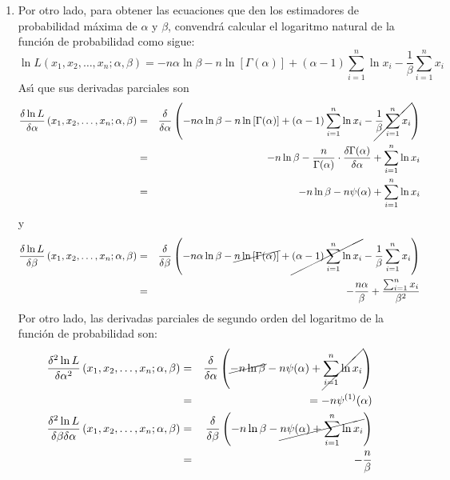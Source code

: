 \begin{solucion}
\begin{enumerate}
  \item Por otro lado, para obtener las ecuaciones que den los estimadores de probabilidad m\'axima de $\alpha$ y $\beta$, convendr\'a calcular el logaritmo natural de la funci\'on de probabilidad como sigue:
  \begin{equation*}
   \ln L \left( x_1, x_2, \ldots, x_n; \alpha, \beta \right) = -n\alpha \ln \beta - n\ln \left[ \Gamma(\alpha) \right] + (\alpha-1)\sum_{i=1}^n \ln x_i - \frac{1}{\beta} \sum_{i=1}^n x_i
  \end{equation*}
  As\'{\i} que sus derivadas parciales son
  \begin{eqnarray*}
   \frac{\delta \ln L}{\delta \alpha} \left( x_1, x_2, \ldots, x_n; \alpha, \beta \right) & = & \frac{\delta}{\delta \alpha} \left( -n\alpha \ln \beta - n\ln \left[ \Gamma(\alpha) \right] + (\alpha-1)\sum_{i=1}^n \ln x_i - \cancel{ \frac{1}{\beta} \sum_{i=1}^n x_i } \right) \\
   & = & -n\ln \beta - \frac{n}{\Gamma(\alpha)} \cdot \frac{\delta \Gamma(\alpha)}{\delta \alpha} + \sum_{i=1}^n \ln x_i \\
   & = & -n\ln \beta - n\psi(\alpha) + \sum_{i=1}^{n} \ln x_i
  \end{eqnarray*}
  y
  \begin{eqnarray*}
   \frac{\delta \ln L}{\delta \beta} \left( x_1, x_2, \ldots, x_n; \alpha, \beta \right) & = & \frac{\delta}{\delta \beta} \left( -n\alpha \ln \beta - \cancel{ n\ln \left[ \Gamma(\alpha) \right] }  + \cancel{ (\alpha-1)\sum_{i=1}^n \ln x_i } - \frac{1}{\beta} \sum_{i=1}^n x_i \right) \\
   & = & - \frac{n\alpha}{\beta} + \frac{\sum_{i=1}^n x_i}{\beta^2}
  \end{eqnarray*}
  Por otro lado, las derivadas parciales de segundo orden del logaritmo de la funci\'on de probabilidad son:
  \begin{eqnarray*}
   \frac{\delta^2 \ln L}{\delta \alpha^2} \left( x_1, x_2, \ldots, x_n; \alpha, \beta \right) & = & \frac{\delta}{\delta \alpha} \left( \cancel{-n\ln \beta} - n\psi(\alpha) + \cancel{\sum_{i=1}^{n} \ln x_i} \right) \\
   & = &  = -n\psi^{(1)}(\alpha) \\
   \frac{\delta^2 \ln L}{\delta \beta \delta\alpha} \left( x_1, x_2, \ldots, x_n; \alpha, \beta \right) & = & \frac{\delta}{\delta \beta} \left( -n\ln \beta - \cancel{n\psi(\alpha) + \sum_{i=1}^{n} \ln x_i} \right) \\
   & = & -\frac{n}{\beta} \\

\end{eqnarray*}
\end{enumerate}
\end{solucion}
